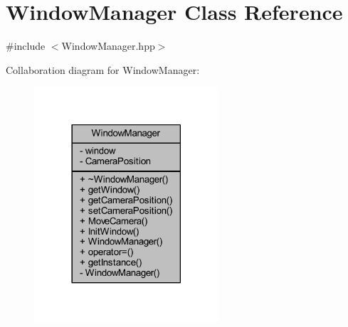 \hypertarget{class_window_manager}{\section{Window\-Manager Class Reference}
\label{class_window_manager}
}


{\ttfamily \#include $<$Window\-Manager.\-hpp$>$}



Collaboration diagram for Window\-Manager\-:\nopagebreak
\begin{figure}[H]
\begin{center}
\leavevmode
\includegraphics[width=194pt]{class_window_manager__coll__graph}
\end{center}
\end{figure}
